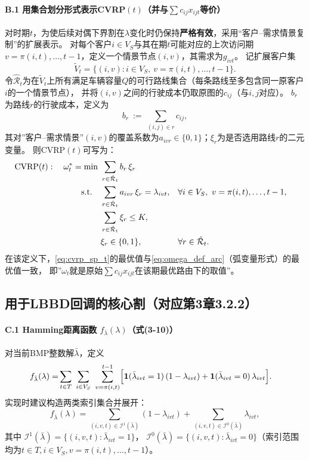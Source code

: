 \documentclass{article}
\begin{document}
\paragraph{B.1 用集合划分形式表示CVRP$(t)$（并与$\sum c_{ij}x_{ijt}$等价）}
对时期$t$，为使后续对偶下界割在$\lambda$变化时仍保持\textbf{严格有效}，采用“客户--需求情景复制”的扩展表示。
对每个客户$i\in V_S$与其在期$t$可能对应的上次访问期$v=\pi(i,t),\ldots,t-1$，定义一个情景节点$(i,v)$，其需求为$g_{ivt}$。
记扩展客户集
\[
\tilde V_t=\{(i,v): i\in V_S,\ v=\pi(i,t),\ldots,t-1\}.
\]
令$\hat{\mathcal R}_t$为在$\tilde V_t$上所有满足车辆容量$Q$的可行路线集合（每条路线至多包含同一原客户$i$的一个情景节点），
并将$(i,v)$之间的行驶成本仍取原图的$c_{ij}$（与$i,j$对应）。
$b_r$为路线$r$的行驶成本，定义为
\begin{equation}
b_r\ :=\ \sum_{(i,j)\in r} c_{ij},
\label{eq:br_def}
\end{equation}
其对”客户--需求情景”$(i,v)$的覆盖系数为$a_{ivr}\in\{0,1\}$；$\xi_r$为是否选用路线$r$的二元变量。
则CVRP$(t)$可写为：
\begin{align}
\text{CVRP}(t):\quad
\omega_t^*=\min\ & \sum_{r\in\hat{\mathcal R}_t} b_r\,\xi_r \notag\\
\text{s.t.}\quad
& \sum_{r\in\hat{\mathcal R}_t} a_{ivr}\,\xi_r = \lambda_{ivt}, && \forall i\in V_S,\ v=\pi(i,t),\dots,t-1, \notag\\
& \sum_{r\in\hat{\mathcal R}_t} \xi_r \le K, \notag\\
& \xi_r\in\{0,1\}, && \forall r\in\hat{\mathcal R}_t .
\label{eq:cvrp_sp_t}
\end{align}
在该定义下，\eqref{eq:cvrp_sp_t}的最优值与\eqref{eq:omega_def_arc}（弧变量形式）的最优值一致，
即”$\omega_t$就是原始$\sum c_{ij}x_{ijt}$在该期最优路由下的取值”。

\subsection{用于LBBD回调的核心割（对应第3章3.2.2）}

\paragraph{C.1 Hamming距离函数 $f_{\bar\lambda}(\lambda)$（式(3-10)）}
对当前BMP整数解$\bar\lambda$，定义
\begin{align}
f_{\bar\lambda}(\lambda)
=&\sum_{t\in T}\ \sum_{i\in V_S}\ \sum_{v=\pi(i,t)}^{t-1}\Bigl[
\mathbf{1}(\bar\lambda_{ivt}=1)\,(1-\lambda_{ivt})
+
\mathbf{1}(\bar\lambda_{ivt}=0)\,\lambda_{ivt}
\Bigr]. \label{eq:flambda_def}
\end{align}
实现时建议构造两类索引集合并展开：
\[
f_{\bar\lambda}(\lambda)=
\sum_{(i,v,t)\in\mathcal I^1(\bar\lambda)} (1-\lambda_{ivt})
+
\sum_{(i,v,t)\in\mathcal I^0(\bar\lambda)} \lambda_{ivt},
\]
其中
$\mathcal I^1(\bar\lambda)=\{(i,v,t):\bar\lambda_{ivt}=1\}$，
$\mathcal I^0(\bar\lambda)=\{(i,v,t):\bar\lambda_{ivt}=0\}$（索引范围均为$t\in T,i\in V_S,v=\pi(i,t),\ldots,t-1$）。
\end{document}
